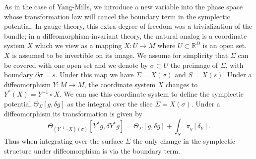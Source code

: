 \documentclass[a4paper,11pt]{article}
\def\pa{\partial}
\newcommand{\R}{\mathbb{R}}
\begin{document}
As in the case of Yang-Mills, we introduce a new variable into the phase space whose transformation law will cancel the boundary term in the symplectic potential.
In gauge theory, this extra degree of freedom was a trivialization of the bundle; in a diffeomorphism-invariant theory, the natural analog is a coordinate system $X$ which we view as a mapping  $X:U \to M$ where $U \subset \R^D$ is an open set. 
$X$ is assumed to be invertible on its image. 
We assume for simplicity that $\Sigma$ can be covered with one open set and  we denote by $\sigma \subset U$ the preimage of $\Sigma$, with boundary $\pa\sigma =s$. 
Under this map we have $\Sigma=X(\sigma) $ and $S= X(s)$.
Under a diffeomorphism $Y:M \to M$, the coordinate system $X$ changes to $Y^*(X) = Y^{-1} \circ X$. We can use this coordinate system to define the symplectic potential $\Theta_{\Sigma}[g, \delta g]$ as the integral over the slice $\Sigma = X(\sigma)$. 
Under a diffeomorphism its transformation is given by
\begin{equation}
\Theta_{(Y^{-1} \circ X)(\sigma)}[Y^*g, \delta Y^*g] = \Theta_\Sigma[g, \delta g] + \int_S \pi_g[\delta_Y].
\end{equation}
Thus when integrating over the surface $\Sigma$ the only change in the symplectic structure under diffeomorphism is via the boundary term.
\end{document}
